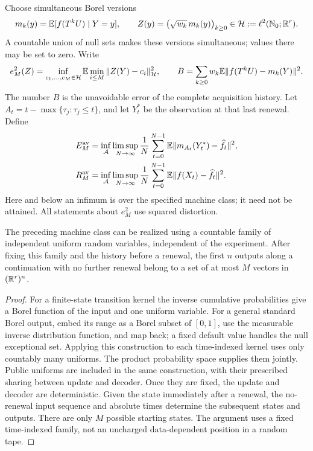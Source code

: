 Choose simultaneous Borel versions
\begin{equation}
 m_k(y)=\mathbb E[f(T^kU)\mid Y=y],\qquad
 Z(y)=\bigl(\sqrt{w_k}\,m_k(y)\bigr)_{k\ge0}\in
 \mathcal H:=\ell^2(\mathbb N_0;\mathbb R^r).                                  \label{eq:v4-posterior-orbit}
\end{equation}
A countable union of null sets makes these versions simultaneous;
values there may be set to zero. Write
\begin{equation}
 e_M^2(Z)=\inf_{c_1,\ldots,c_M\in\mathcal H}
       \mathbb E\min_{i\le M}\|Z(Y)-c_i\|_{\mathcal H}^2,
 \qquad
 B=\sum_{k\ge0}w_k\mathbb E\|f(T^kU)-m_k(Y)\|^2.                       \label{eq:v4-bayes-floor}
\end{equation}
The number $B$ is the unavoidable error of the complete acquisition
history. Let $A_t=t-\max\{\tau_j:\tau_j\le t\}$, and let $Y_t^*$
be the observation at that last renewal. Define
\begin{align}
 E_M^{\rm av}
 &=\inf_{\mathcal A}\limsup_{N\to\infty}\frac1N
       \sum_{t=0}^{N-1}\mathbb E\|m_{A_t}(Y_t^*)-\widehat f_t\|^2,
                                                               \label{eq:v4-excess-risk}\\
 R_M^{\rm av}
 &=\inf_{\mathcal A}\limsup_{N\to\infty}\frac1N
       \sum_{t=0}^{N-1}\mathbb E\|f(X_t)-\widehat f_t\|^2.
\end{align}
Here and below an infimum is over the specified machine class; it need
not be attained. All statements about $e_M^2$ use squared distortion.

\begin{lemma}\label{lem:v4-kernels}
The preceding machine class can be realized using a countable family
of independent uniform random variables, independent of the experiment.
After fixing this family and the history before a renewal, the first
$n$ outputs along a continuation with no further renewal belong to a
set of at most $M$ vectors in $(\mathbb R^r)^n$.
\end{lemma}
\begin{proof}
For a finite-state transition kernel the inverse cumulative
probabilities give a Borel function of the input and one uniform
variable. For a general standard Borel output, embed its range as a
Borel subset of $[0,1]$, use the measurable inverse distribution
function, and map back; a fixed default value handles the null
exceptional set. Applying this construction to each time-indexed
kernel uses only countably many uniforms. The product probability
space supplies them jointly. Public uniforms are included in the
same construction, with their prescribed sharing between update and
decoder. Once they are fixed, the update and decoder are deterministic.
Given the state immediately after a renewal, the no-renewal input
sequence and absolute times determine the subsequent states and
outputs. There are only $M$ possible starting states. The argument
uses a fixed time-indexed family, not an uncharged data-dependent
position in a random tape.
\end{proof}

